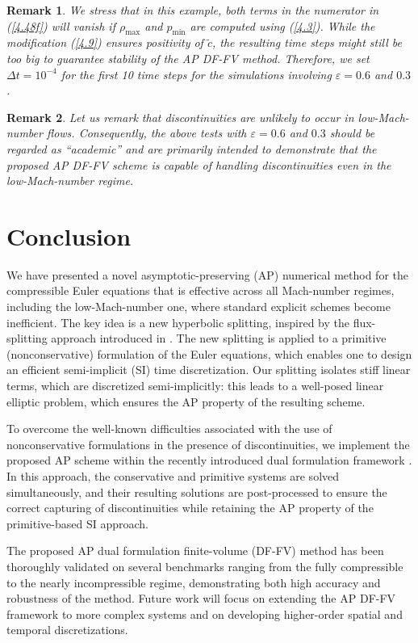 \documentclass[preprint,12pt]{elsarticle}
\newtheorem{remark}{Remark}[section]
\newcommand{\dt}{\Delta t}
\newcommand{\ve}{\varepsilon}
\newcommand\eref[1]{(\ref{#1})}
\begin{document}
\begin{remark}
	We stress that in this example, both terms in the numerator in \eref{4.48f} will vanish if $\rho_{\max}$ and $p_{\min}$ are computed using
	\eref{4.3}. While the modification \eref{4.9} ensures positivity of $\tilde c$, the resulting time steps might still be too big to guarantee
	stability of the AP DF-FV method. Therefore, we set $\dt=10^{-4}$ for the first 10 time steps for the simulations involving $\ve=0.6$ and
	$0.3$.
\end{remark}
\begin{remark}
	Let us remark that discontinuities are unlikely to occur in low-Mach-number flows. Consequently, the above tests with $\ve=0.6$ and $0.3$
	should be regarded as ``academic'' and are primarily intended to demonstrate that the proposed AP DF-FV scheme is capable of handling
	discontinuities even in the low-Mach-number regime.
\end{remark}

\section{Conclusion}\label{sec5}
We have presented a novel asymptotic-preserving (AP) numerical method for the compressible Euler equations that is effective across all
Mach-number regimes, including the low-Mach-number one, where standard explicit schemes become inefficient. The key idea is a new 
hyperbolic splitting, inspired by the flux-splitting approach introduced in \cite{haack2012all}. The new splitting is applied to a 
primitive (nonconservative) formulation of the Euler equations, which enables one to design an efficient semi-implicit (SI) time 
discretization. Our splitting isolates stiff linear terms, which are discretized semi-implicitly: this leads to a well-posed linear 
elliptic problem, which ensures the AP property of the resulting scheme.

To overcome the well-known difficulties associated with the use of nonconservative formulations in the presence of discontinuities, we
implement the proposed AP scheme within the recently introduced dual formulation framework \cite{CFKM,ACKM}. In this approach, the
conservative and primitive systems are solved simultaneously, and their resulting solutions are post-processed to ensure the correct
capturing of discontinuities while retaining the AP property of the primitive-based SI approach.

The proposed AP dual formulation finite-volume (DF-FV) method has been thoroughly validated on several benchmarks ranging from the fully
compressible to the nearly incompressible regime, demonstrating both high accuracy and robustness of the method. Future work will focus on
extending the AP DF-FV framework to more complex systems and on developing higher-order spatial and temporal discretizations.
\end{document}
